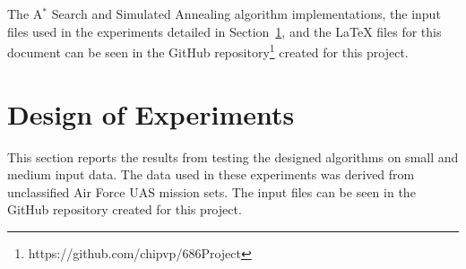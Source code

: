 \documentclass[conference]{IEEEtran}
\begin{document}
The A$^*$ Search and Simulated Annealing algorithm implementations, the input
files used in the experiments detailed in Section~\ref{sec:experiment}, and the
{\LaTeX} files for this document can be seen in the GitHub
repository\footnote{https://github.com/chipvp/686Project} created for this
project.

\section{Design of Experiments} \label{sec:experiment}

 
This section reports the results from testing the designed algorithms on small
and medium input data. The data used in these experiments was derived from
unclassified Air Force UAS mission sets. The input files can be seen in the
GitHub repository created for this project.
\end{document}
